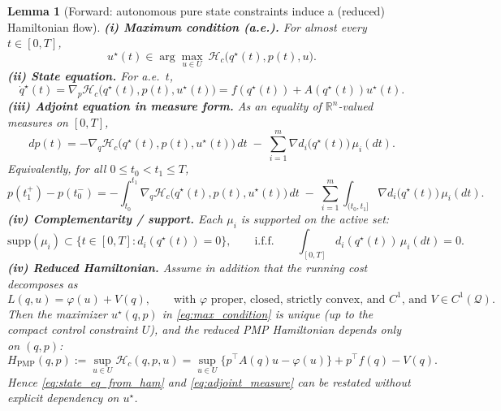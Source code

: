 \documentclass{article} %
\newtheorem{lemma}[theorem]{Lemma}         %
\begin{document}
\begin{lemma}[Forward: autonomous pure state constraints induce a (reduced) Hamiltonian flow]
\smallskip
\noindent\textbf{(i) Maximum condition (a.e.).}
For almost every $t\in[0,T]$,
\begin{equation}
u^\star(t)\in \arg\max_{u\in U}\ \mathcal{H}_c\big(q^\star(t),p(t),u\big).
\label{eq:max_condition}
\end{equation}
\noindent\textbf{(ii) State equation.}
For a.e.\ $t$,
\begin{equation}
\dot q^\star(t)=\nabla_p \mathcal{H}_c\big(q^\star(t),p(t),u^\star(t)\big)
= f(q^\star(t))+A(q^\star(t))u^\star(t).
\label{eq:state_eq_from_ham}
\end{equation}
\noindent\textbf{(iii) Adjoint equation in measure form.}
As an equality of $\mathbb{R}^n$-valued measures on $[0,T]$,
\begin{equation}
dp(t)= -\nabla_q \mathcal{H}_c\big(q^\star(t),p(t),u^\star(t)\big)\,dt
\;-\;\sum_{i=1}^m \nabla d_i\big(q^\star(t)\big)\,\mu_i(dt).
\label{eq:adjoint_measure}
\end{equation}
Equivalently, for all $0\le t_0<t_1\le T$,
\begin{equation}
p(t_1^+)-p(t_0^-)
= -\int_{t_0}^{t_1}\nabla_q \mathcal{H}_c\big(q^\star(t),p(t),u^\star(t)\big)\,dt
\;-\;\sum_{i=1}^m \int_{(t_0,t_1]} \nabla d_i\big(q^\star(t)\big)\,\mu_i(dt).
\label{eq:adjoint_integral}
\end{equation}
\noindent\textbf{(iv) Complementarity / support.}
Each $\mu_i$ is supported on the active set:
\begin{equation}
\mathrm{supp}(\mu_i)\subset \{t\in[0,T]: d_i(q^\star(t))=0\},
\qquad\text{i.f.f.}\qquad
\int_{[0,T]} d_i(q^\star(t))\,\mu_i(dt)=0.
\label{eq:complementarity_measure}
\end{equation}
\noindent\textbf{(iv) Reduced Hamiltonian.} Assume in addition that the running cost decomposes as
\begin{equation}
L(q,u)=\varphi(u)+V(q),
\qquad\text{with $\varphi$ proper, closed, strictly convex, and $C^1$, and $V\in C^1(\mathcal Q)$.}
\label{eq:cost_split_B_statecon}
\end{equation}
Then the maximizer $u^\star(q,p)$ in \cref{eq:max_condition} is unique (up to the compact control constraint $U$),
and the reduced PMP Hamiltonian depends only on $(q,p)$:
\begin{equation}
\label{eq:def_reduced_ham_pmp_statecon}
H_{\mathrm{PMP}}(q,p)
:=\sup_{u\in U}\mathcal H_c(q,p,u)
=\sup_{u\in U}\big\{p^\top A(q)u-\varphi(u)\big\}+p^\top f(q)-V(q).
\end{equation}
Hence \cref{eq:state_eq_from_ham} and \cref{eq:adjoint_measure} can be restated without explicit dependency on $u^\star$.
\end{lemma}
\end{document}
